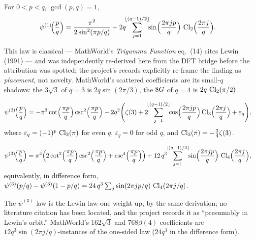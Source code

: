 \begin{law}\label{bridge:law:psi1}
For $0<p<q$, $\gcd(p,q)=1$,
\[
\psi^{(1)}\!\Bigl(\frac{p}{q}\Bigr)
=\frac{\pi^2}{2\sin^2(\pi p/q)}
+2q\!\!\sum_{j=1}^{\lfloor(q-1)/2\rfloor}\!\!\sin\Bigl(\frac{2\pi jp}{q}\Bigr)\,
\operatorname{Cl}_2\Bigl(\frac{2\pi j}{q}\Bigr).
\]
\end{law}

This law is classical --- MathWorld's \emph{Trigamma Function} eq.~(14) cites Lewin
(1991) \cite{bridge:Lewin} --- and was independently re-derived here from the DFT bridge before the attribution
was spotted; the project's records explicitly re-frame the finding as \emph{placement},
not novelty. MathWorld's scattered coefficients are its small-$q$ shadows: the $3\sqrt3$
of $q=3$ is $2q\sin(2\pi/3)$, the $8G$ of $q=4$ is $2q\,\operatorname{Cl}_2(\pi/2)$.

\begin{law}[tetragamma]\label{bridge:law:psi2}
\[
\psi^{(2)}\!\Bigl(\frac{p}{q}\Bigr)
=-\pi^3\cot\Bigl(\frac{\pi p}{q}\Bigr)\csc^2\Bigl(\frac{\pi p}{q}\Bigr)
-2q^2\Biggl(\zeta(3)
+2\!\!\sum_{j=1}^{\lfloor(q-1)/2\rfloor}\!\!\cos\Bigl(\frac{2\pi jp}{q}\Bigr)
\operatorname{Cl}_3\Bigl(\frac{2\pi j}{q}\Bigr)+\varepsilon_q\Biggr),
\]
where $\varepsilon_q=(-1)^p\,\operatorname{Cl}_3(\pi)$ for even $q$, $\varepsilon_q=0$ for odd $q$,
and $\operatorname{Cl}_3(\pi)=-\tfrac34\zeta(3)$.
\end{law}

\begin{law}[pentagamma]\label{bridge:law:psi3}
\[
\psi^{(3)}\!\Bigl(\frac{p}{q}\Bigr)
=\pi^4\Bigl(2\cot^2\Bigl(\frac{\pi p}{q}\Bigr)\csc^2\Bigl(\frac{\pi p}{q}\Bigr)
+\csc^4\Bigl(\frac{\pi p}{q}\Bigr)\Bigr)
+12\,q^3\!\!\sum_{j=1}^{\lfloor(q-1)/2\rfloor}\!\!\sin\Bigl(\frac{2\pi jp}{q}\Bigr)\,
\operatorname{Cl}_4\Bigl(\frac{2\pi j}{q}\Bigr),
\]
equivalently, in difference form,
$\psi^{(3)}(p/q)-\psi^{(3)}(1-p/q)=24\,q^3\sum_j\sin(2\pi jp/q)\,\operatorname{Cl}_4(2\pi j/q)$.
\end{law}

The $\psi^{(3)}$ law is the Lewin law one weight up, by the same derivation; no literature
citation has been located, and the project records it as ``presumably in Lewin's orbit.''
MathWorld's $162\sqrt3$ and $768\beta(4)$ coefficients are $12q^3\sin(2\pi j/q)$-instances
of the one-sided law ($24q^3$ in the difference form).

